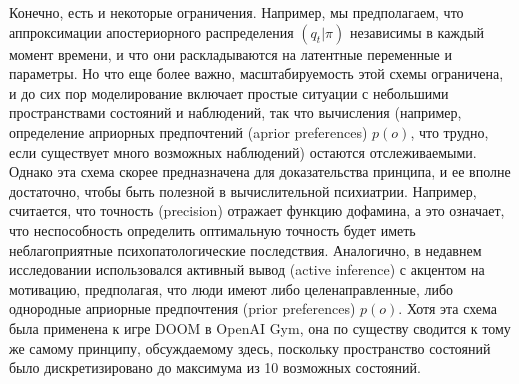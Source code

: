 \documentclass[twoside,leqno, 11pt]{article}
\begin{document}
	
	Конечно, есть и некоторые ограничения. Например, мы предполагаем, что аппроксимации апостериорного распределения $(q_t|\pi)$ независимы в каждый момент времени, и что они раскладываются на латентные переменные и параметры. Но что еще более важно, масштабируемость этой схемы ограничена, и до сих пор моделирование включает простые ситуации с небольшими пространствами состояний и наблюдений, так что вычисления (например, определение априорных предпочтений (aprior preferences) $p(o)$, что трудно, если существует много возможных наблюдений) остаются отслеживаемыми. Однако эта схема скорее предназначена для доказательства принципа, и ее вполне достаточно, чтобы быть полезной в вычислительной психиатрии. Например, считается, что точность (precision) отражает функцию дофамина, а это означает, что неспособность определить оптимальную точность будет иметь неблагоприятные психопатологические последствия. Аналогично, в недавнем исследовании использовался активный вывод (active inference) с акцентом на мотивацию, предполагая, что люди имеют либо целенаправленные, либо однородные априорные предпочтения (prior preferences) $p(o)$. Хотя эта схема была применена к игре DOOM в OpenAI Gym, она по существу сводится к тому же самому принципу, обсуждаемому здесь, поскольку пространство состояний было дискретизировано до максимума из 10 возможных состояний.
	
\end{document}
